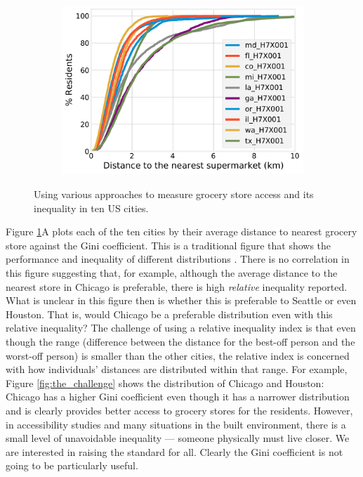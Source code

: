 \documentclass[final,3p,times,onecolumn,sort&compress]{elsarticle}
\begin{document}
\begin{figure}[]
\begin{subfigure}{0.5\textwidth}
    \end{subfigure}
    \begin{subfigure}{0.5\textwidth}
        \includegraphics[width=0.9\linewidth]{report/fig/CDF_H7X001.pdf} 
    \end{subfigure}
    \caption{
    Using various approaches to measure grocery store access and its inequality in ten US cities.
    }
    \label{fig:food_deserts}
\end{figure}

Figure \ref{fig:food_deserts}A plots each of the ten cities by their average distance to nearest grocery store against the Gini coefficient.
This is a traditional figure that shows the performance and inequality of different distributions \citep{Adger1997-tu}.
There is no correlation in this figure suggesting that, for example, although the average distance to the nearest store in Chicago is preferable, there is high \textit{relative} inequality reported.
What is unclear in this figure then is whether this is preferable to Seattle or even Houston. 
That is, would Chicago be a preferable distribution even with this relative inequality?
The challenge of using a relative inequality index is that even though the range (difference between the distance for the best-off person and the worst-off person) is smaller than the other cities, the relative index is concerned with how individuals' distances are distributed within that range.
For example, Figure \ref{fig:the_challenge} shows the distribution of Chicago and Houston: Chicago has a higher Gini coefficient even though it has a narrower distribution and is clearly provides better access to grocery stores for the residents.
However, in accessibility studies and many situations in the built environment, there is a small level of unavoidable inequality --- someone physically must live closer.
We are interested in raising the standard for all.
Clearly the Gini coefficient is not going to be particularly useful.
\end{document}
